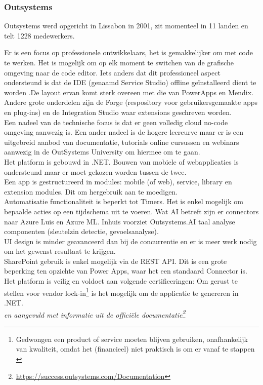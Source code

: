 \subsubsection{Outsystems}

Outsystems werd opgericht in Lissabon in 2001, zit momenteel in 11 landen en telt 1228 medewerkers.

Er is een focus op professionele ontwikkelaars, het is gemakkelijker om met code te werken. Het is mogelijk om op elk moment te switchen van de grafische omgeving naar de code editor. Iets anders dat dit professioneel aspect ondersteund is dat de IDE (genaamd Service Studio) offline geïnstalleerd dient te worden .De layout ervan komt sterk overeen met die van PowerApps en Mendix. Andere grote onderdelen zijn de Forge (respository voor gebruikersgemaakte apps en plug-ins) en de Integration Studio waar extensions geschreven worden.\\
Een nadeel van de technische focus is dat er geen volledig cloud no-code omgeving aanwezig is. Een ander nadeel is de hogere leercurve maar er is een uitgebreid aanbod van documentatie, tutorials online cursussen en webinars aanwezig in de OutSystems University om hiermee om te gaan.\\
Het platform is gebouwd in .NET. Bouwen van mobiele of webapplicaties is ondersteund maar er moet gekozen worden tussen de twee.\\
Een app is gestructureerd in modules: mobile (of web), service, library en extension modules. Dit om hergebruik aan te moedigen.\\
Automatisatie functionaliteit is beperkt tot Timers. Het is enkel mogelijk om bepaalde acties op een tijdschema uit te voeren. Wat AI betreft zijn er connectors naar Azure Luis en Azure ML. Inhuis voorziet Outsystems.AI taal analyse componenten (sleutelzin detectie, gevoelsanalyse).\\
UI design is minder geavanceerd dan bij de concurrentie en er is meer werk nodig om het gewenst resultaat te krijgen.\\
SharePoint gebruik is enkel mogelijk via de REST API. Dit is een grote beperking ten opzichte van Power Apps, waar het een standaard Connector is.\\
Het platform is veilig en voldoet aan volgende certifieeringen: %
Om gerust te stellen voor vendor lock-in\footnote{Gedwongen een product of service moeten blijven gebruiken, onafhankelijk van kwaliteit, omdat het (financieel) niet praktisch is om er vanaf te stappen \autocite{Cloudflare}} is het mogelijk om de applicatie te genereren in .NET.\\
\autocite{Marvin2017} \textit{en aangevuld met informatie uit de officiële documentatie\footnote{\url{https://success.outsystems.com/Documentation}}} 


